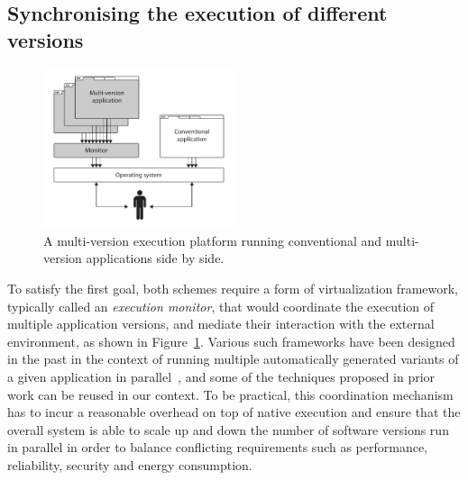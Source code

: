 
\subsection{Synchronising the execution of different versions}

\begin{figure}[t]
  \begin{center}
    \includegraphics[width=0.5\textwidth]{multi-version/figures/platform}
    \caption{A multi-version execution platform running conventional and multi-version
      applications side by side.}
    \label{fig:mx-platform}
  \end{center}
\end{figure}

To satisfy the first goal, both schemes require a form of virtualization
framework, typically called an \emph{execution monitor}, that would coordinate
the execution of multiple application versions, and mediate their interaction
with the external environment, as shown in Figure~\ref{fig:mx-platform}.
Various such frameworks have been designed in the past in the context of
running multiple automatically generated variants of a given application in
parallel~\cite{diehard06,cox2006,orchestra09}, and some of the techniques
proposed in prior work can be reused in our context. To be practical, this
coordination mechanism has to incur a reasonable overhead on top of native
execution and ensure that the overall system is able to scale up and down the
number of software versions run in parallel in order to balance conflicting
requirements such as performance, reliability, security and energy consumption.


